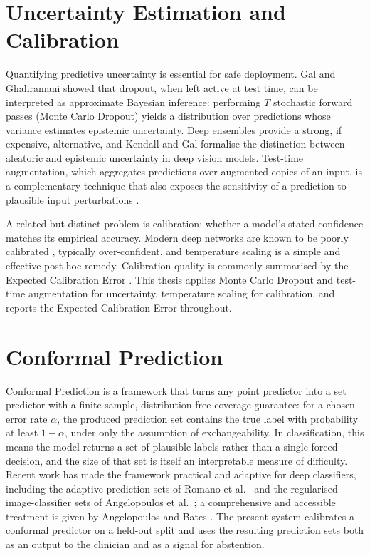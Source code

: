 \section{Uncertainty Estimation and Calibration}
Quantifying predictive uncertainty is essential for safe deployment. Gal and Ghahramani \cite{gal2016dropout} showed that dropout, when left active at test time, can be interpreted as approximate Bayesian inference: performing $T$ stochastic forward passes (Monte Carlo Dropout) yields a distribution over predictions whose variance estimates epistemic uncertainty. Deep ensembles \cite{lakshminarayanan2017simple} provide a strong, if expensive, alternative, and Kendall and Gal \cite{kendall2017uncertainties} formalise the distinction between aleatoric and epistemic uncertainty in deep vision models. Test-time augmentation, which aggregates predictions over augmented copies of an input, is a complementary technique that also exposes the sensitivity of a prediction to plausible input perturbations \cite{wang2019aleatoric}.

A related but distinct problem is calibration: whether a model's stated confidence matches its empirical accuracy. Modern deep networks are known to be poorly calibrated \cite{guo2017calibration}, typically over-confident, and temperature scaling is a simple and effective post-hoc remedy. Calibration quality is commonly summarised by the Expected Calibration Error \cite{naeini2015obtaining}. This thesis applies Monte Carlo Dropout and test-time augmentation for uncertainty, temperature scaling for calibration, and reports the Expected Calibration Error throughout.

\section{Conformal Prediction}
Conformal Prediction \cite{vovk2005algorithmic, shafer2008tutorial} is a framework that turns any point predictor into a set predictor with a finite-sample, distribution-free coverage guarantee: for a chosen error rate $\alpha$, the produced prediction set contains the true label with probability at least $1-\alpha$, under only the assumption of exchangeability. In classification, this means the model returns a set of plausible labels rather than a single forced decision, and the size of that set is itself an interpretable measure of difficulty. Recent work has made the framework practical and adaptive for deep classifiers, including the adaptive prediction sets of Romano et al.\ \cite{romano2020classification} and the regularised image-classifier sets of Angelopoulos et al.\ \cite{angelopoulos2021uncertainty}; a comprehensive and accessible treatment is given by Angelopoulos and Bates \cite{angelopoulos2023gentle}. The present system calibrates a conformal predictor on a held-out split and uses the resulting prediction sets both as an output to the clinician and as a signal for abstention.

